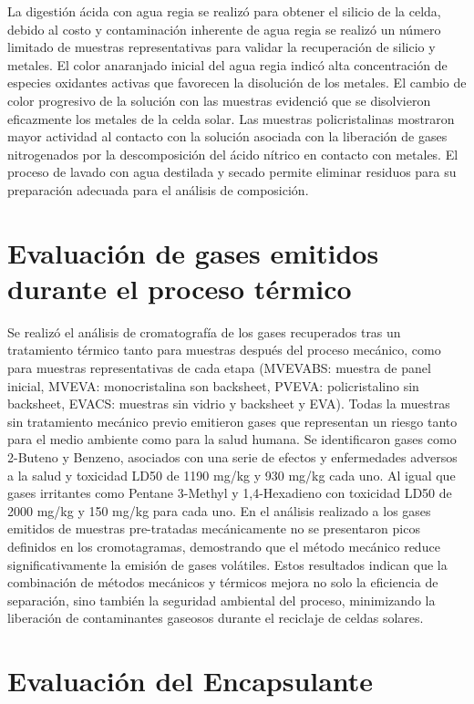  La digestión ácida con agua regia se realizó para obtener el silicio de la celda, debido al costo y contaminación inherente de agua regia se realizó un número limitado de muestras representativas para validar la recuperación de silicio y metales. 
 El color anaranjado inicial del agua regia indicó alta concentración de especies oxidantes activas que favorecen la disolución de los metales. El cambio de color progresivo de la solución con las muestras evidenció que se disolvieron eficazmente los metales de la celda solar. 
 Las muestras policristalinas mostraron mayor actividad al contacto con la solución asociada con la liberación de gases nitrogenados por la descomposición del ácido nítrico en contacto con metales. 
 El proceso de lavado con agua destilada y secado permite eliminar residuos para su preparación adecuada para el análisis de composición.
  
\section{Evaluación de gases emitidos durante el proceso térmico}
\label{sec:Conclusiones gases emitidos}
 
 Se realizó el análisis de cromatografía de los gases recuperados tras un tratamiento térmico tanto para muestras después del proceso mecánico, como para muestras representativas de cada etapa (MVEVABS: muestra de panel inicial, MVEVA: monocristalina son backsheet, PVEVA: policristalino sin backsheet, EVACS: muestras sin vidrio y backsheet y EVA). Todas la muestras sin tratamiento mecánico previo emitieron gases que representan un riesgo tanto para el medio ambiente como para la salud humana. Se identificaron gases como 2-Buteno y Benzeno, asociados con una serie de efectos y enfermedades adversos a la salud y toxicidad LD50 de 1190 mg/kg y 930 mg/kg cada uno. Al igual que gases irritantes como Pentane 3-Methyl y 1,4-Hexadieno con toxicidad LD50 de 2000 mg/kg y 150 mg/kg para cada uno.  
 En el análisis realizado a los gases emitidos de muestras pre-tratadas mecánicamente no se presentaron picos definidos en los cromotagramas, demostrando que el método mecánico reduce significativamente la emisión de gases volátiles. 
 Estos resultados indican que la combinación de métodos mecánicos y térmicos mejora no solo la eficiencia de separación, sino también la seguridad ambiental del proceso, minimizando la liberación de contaminantes gaseosos durante el reciclaje de celdas solares.
 
 \section{Evaluación del Encapsulante}
 \label{sec:Conclusiones encapsulante}
 
